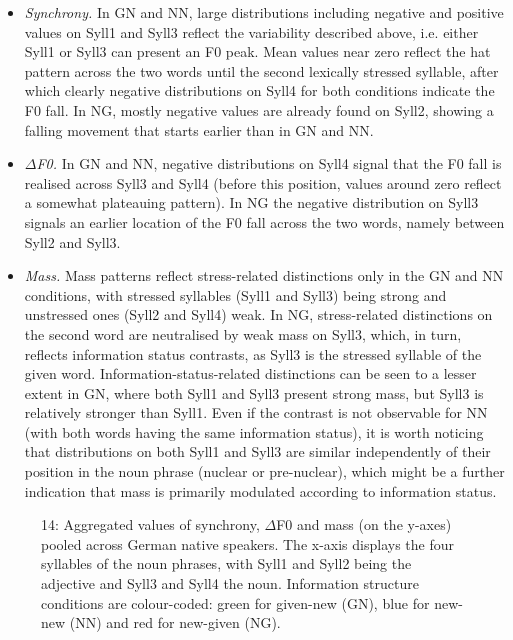\begin{itemize}
\item \textit{Synchrony.} In GN and NN, large distributions including negative and positive values on Syll1 and Syll3 reflect the variability described above, i.e. either Syll1 or Syll3 can present an F0 peak. Mean values near zero reflect the hat pattern across the two words until the second lexically stressed syllable, after which clearly negative distributions on Syll4 for both conditions indicate the F0 fall. In NG, mostly negative values are already found on Syll2, showing a falling movement that starts earlier than in GN and NN.
\item \textit{${\Delta}$F0.} In GN and NN, negative distributions on Syll4 signal that the F0 fall is realised across Syll3 and Syll4 (before this position, values around zero reflect a somewhat plateauing pattern). In NG the negative distribution on Syll3 signals an earlier location of the F0 fall across the two words, namely between Syll2 and Syll3.
\item \textit{Mass.} Mass patterns reflect stress-related distinctions only in the GN and NN conditions, with stressed syllables (Syll1 and Syll3) being strong and unstressed ones (Syll2 and Syll4) weak. In NG, stress-related distinctions on the second word are neutralised by weak mass on Syll3, which, in turn, reflects information status contrasts, as Syll3 is the stressed syllable of the given word. Information-status-related distinctions can be seen to a lesser extent in GN, where both Syll1 and Syll3 present strong mass, but Syll3 is relatively stronger than Syll1. Even if the contrast is not observable for NN (with both words having the same information status), it is worth noticing that distributions on both Syll1 and Syll3 are similar independently of their position in the noun phrase (nuclear or pre-nuclear), which might be a further indication that mass is primarily modulated according to information status.
\end{itemize}
\begin{stylecaption}
  
 
\end{stylecaption}

\begin{stylecaption}\begin{figure}
\caption{14: Aggregated values of synchrony, ${\Delta}$F0 and mass (on the y-axes) pooled across German native speakers. The x-axis displays the four syllables of the noun phrases, with Syll1 and Syll2 being the adjective and Syll3 and Syll4 the noun. Information structure conditions are colour-coded: green for given-new (GN), blue for new-new (NN) and red for new-given (NG).}
\label{fig:key:2}
\end{figure}\end{stylecaption}


